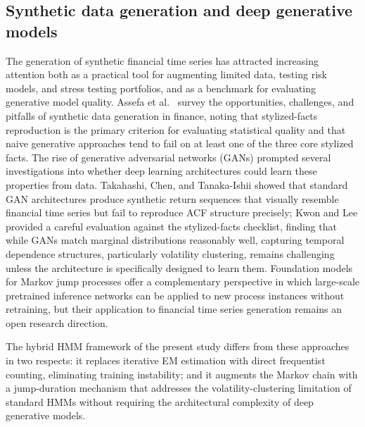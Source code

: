 \subsection{Synthetic data generation and deep generative models}
The generation of synthetic financial time series has attracted increasing attention both as a practical tool for augmenting limited data, testing risk models, and stress testing portfolios, and as a benchmark for evaluating generative model quality. Assefa et al.\ \cite{assefa_generating_2021} survey the opportunities, challenges, and pitfalls of synthetic data generation in finance, noting that stylized-facts reproduction is the primary criterion for evaluating statistical quality and that naive generative approaches tend to fail on at least one of the three core stylized facts. The rise of generative adversarial networks (GANs) prompted several investigations into whether deep learning architectures could learn these properties from data. Takahashi, Chen, and Tanaka-Ishii \cite{takahashi_2019} showed that standard GAN architectures produce synthetic return sequences that visually resemble financial time series but fail to reproduce ACF structure precisely; Kwon and Lee \cite{kwon_can_2024} provided a careful evaluation against the stylized-facts checklist, finding that while GANs match marginal distributions reasonably well, capturing temporal dependence structures, particularly volatility clustering, remains challenging unless the architecture is specifically designed to learn them. Foundation models for Markov jump processes \cite{berghaus_foundation_2025} offer a complementary perspective in which large-scale pretrained inference networks can be applied to new process instances without retraining, but their application to financial time series generation remains an open research direction.

The hybrid HMM framework of the present study differs from these approaches in two respects: it replaces iterative EM estimation with direct frequentist counting, eliminating training instability; and it augments the Markov chain with a jump-duration mechanism that addresses the volatility-clustering limitation of standard HMMs without requiring the architectural complexity of deep generative models.

